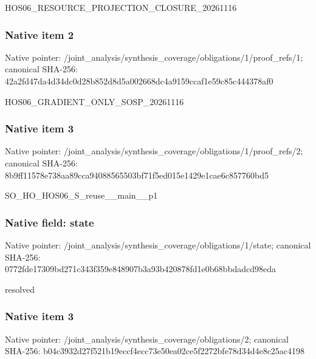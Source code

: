 \documentclass[10pt,a4paper]{article}
\begin{document}
\begingroup\raggedright\sloppy HOS06\_\allowbreak{}RESOURCE\_\allowbreak{}PROJECTION\_\allowbreak{}CLOSURE\_\allowbreak{}20261116\par\endgroup

\subsubsection{Native item 2}
Native pointer: /joint\_\allowbreak{}analysis/synthesis\_\allowbreak{}coverage/obligations/1/proof\_\allowbreak{}refs/1; canonical SHA-256: 42a2fd47da4d34dc0d28b852d8d5a002668dc4a9159ccaf1e59c85c444378af0

\begingroup\raggedright\sloppy HOS06\_\allowbreak{}GRADIENT\_\allowbreak{}ONLY\_\allowbreak{}SOSP\_\allowbreak{}20261116\par\endgroup

\subsubsection{Native item 3}
Native pointer: /joint\_\allowbreak{}analysis/synthesis\_\allowbreak{}coverage/obligations/1/proof\_\allowbreak{}refs/2; canonical SHA-256: 8b9ff11578e738aa89cca94088565503bf71f5ed015e1429e1cae6c857760bd5

\begingroup\raggedright\sloppy SO\_\allowbreak{}HO\_\allowbreak{}HOS06\_\allowbreak{}S\_\allowbreak{}reuse\_\allowbreak{}\_\allowbreak{}main\_\allowbreak{}\_\allowbreak{}p1\par\endgroup

\subsubsection{Native field: state}
Native pointer: /joint\_\allowbreak{}analysis/synthesis\_\allowbreak{}coverage/obligations/1/state; canonical SHA-256: 0772fde17309bd271c343f359e848907b3a93b420878fd1e0b68bbdadcd98eda

\begingroup\raggedright\sloppy resolved\par\endgroup

\subsubsection{Native item 3}
Native pointer: /joint\_\allowbreak{}analysis/synthesis\_\allowbreak{}coverage/obligations/2; canonical SHA-256: b04c3932d27f521b19eccf4ecc73e50ea02ce5f2272bfe78d34d4e8c25ac4198
\end{document}
